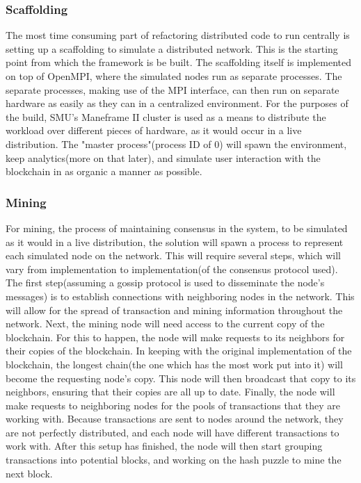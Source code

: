 \documentclass[11pt]{article}
\begin{document}
    \subsubsection{Scaffolding}
    The most time consuming part of refactoring distributed code to run centrally is setting up a scaffolding to simulate
    a distributed network.
    This is the starting point from which the framework is be built.
    The scaffolding itself is implemented on top of OpenMPI, where the simulated nodes run as separate processes.
    The separate processes, making use of the MPI interface, can then run on separate hardware as easily as they can in
    a centralized environment.
    For the purposes of the build, SMU's Maneframe II cluster is used as a means to distribute the workload over different
    pieces of hardware, as it would occur in a live distribution.
    The "master process"(process ID of 0) will spawn the environment, keep analytics(more on that later), and simulate
    user interaction with the blockchain in as organic a manner as possible.
    \subsubsection{Mining}
    For mining, the process of maintaining consensus in the system, to be simulated as it would in a live distribution,
    the solution will spawn a process to represent each simulated node on the network.
    This will require several steps, which will vary from implementation to implementation(of the consensus protocol used).
    The first step(assuming a gossip protocol is used to disseminate the node's messages) is to establish connections
    with neighboring nodes in the network.
    This will allow for the spread of transaction and mining information throughout the network.
    Next, the mining node will need access to the current copy of the blockchain.
    For this to happen, the node will make requests to its neighbors for their copies of the blockchain.
    In keeping with the original implementation of the blockchain, the longest chain(the one which has the most work
    put into it) will become the requesting node's copy.
    This node will then broadcast that copy to its neighbors, ensuring that their copies are all up to date.
    Finally, the node will make requests to neighboring nodes for the pools of transactions that they are working with.
    Because transactions are sent to nodes around the network, they are not perfectly distributed, and each node will
    have different transactions to work with.
    After this setup has finished, the node will then start grouping transactions into potential blocks, and working on
    the hash puzzle to mine the next block.
\end{document}
